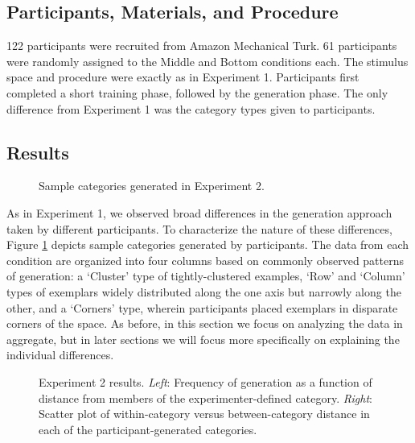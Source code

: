 \documentclass[12pt]{article}
\newcommand\inputpgf[2]{{
\let\pgfimageWithoutPath\pgfimage
\renewcommand{\pgfimage}[2][]{\pgfimageWithoutPath[##1]{#1/##2}}

}}
\begin{document}
\begin{flushleft}
\subsection{Participants, Materials, and Procedure}

122 participants were recruited from Amazon Mechanical Turk. 61 participants
were randomly assigned to the Middle and Bottom conditions each. The stimulus
space and procedure were exactly as in Experiment 1. Participants first
completed a short training phase, followed by the generation phase. The only
difference from Experiment 1 was the category types given to participants.


\subsection{Results}

\begin{figure}
    \begin{center} \inputpgf{figs/}{e2-samples.pgf}
    \caption{Sample categories generated in Experiment 2. }
    \label{fig:e2-samples}
    \end{center}
\end{figure}


As in Experiment 1, we observed broad differences in the generation approach
taken by different participants. To characterize the nature of these
differences, Figure \ref{fig:e2-samples} depicts sample categories generated by
participants. The data from each condition are organized into four columns based
on commonly observed patterns of generation: a `Cluster' type of
tightly-clustered examples, `Row' and `Column' types of exemplars widely
distributed along the one axis but narrowly along the other, and a `Corners'
type, wherein participants placed exemplars in disparate corners of the space.
As before, in this section we focus on analyzing the data in aggregate, but in
later sections we will focus more specifically on explaining the individual
differences.

\begin{figure}
    \begin{center} \inputpgf{figs/}{e2-distanceplots.pgf}
    \caption{Experiment 2 results. {\em Left}: Frequency of generation as a
function of distance from members of the experimenter-defined category. {\em
Right}: Scatter plot of within-category versus between-category distance in each
of the participant-generated categories.}
    \label{fig:e2-distanceplots}
    \end{center}
\end{figure}


\end{flushleft}
\end{document}
